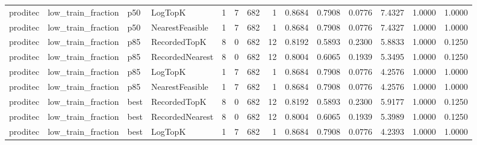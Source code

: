 \begin{tabular}{llllrrrrrrrrrr}
proditec &   low\_train\_fraction &    p50 &         LogTopK &           1 &          7 &            682 &                   1 &         0.8684 &          0.7908 &                    0.0776 &         7.4327 &                 1.0000 &                  1.0000 \\
proditec &   low\_train\_fraction &    p50 & NearestFeasible &           1 &          7 &            682 &                   1 &         0.8684 &          0.7908 &                    0.0776 &         7.4327 &                 1.0000 &                  1.0000 \\
proditec &   low\_train\_fraction &    p85 &    RecordedTopK &           8 &          0 &            682 &                  12 &         0.8192 &          0.5893 &                    0.2300 &         5.8833 &                 1.0000 &                  0.1250 \\
proditec &   low\_train\_fraction &    p85 & RecordedNearest &           8 &          0 &            682 &                  12 &         0.8004 &          0.6065 &                    0.1939 &         5.3495 &                 1.0000 &                  0.1250 \\
proditec &   low\_train\_fraction &    p85 &         LogTopK &           1 &          7 &            682 &                   1 &         0.8684 &          0.7908 &                    0.0776 &         4.2576 &                 1.0000 &                  1.0000 \\
proditec &   low\_train\_fraction &    p85 & NearestFeasible &           1 &          7 &            682 &                   1 &         0.8684 &          0.7908 &                    0.0776 &         4.2576 &                 1.0000 &                  1.0000 \\
proditec &   low\_train\_fraction &   best &    RecordedTopK &           8 &          0 &            682 &                  12 &         0.8192 &          0.5893 &                    0.2300 &         5.9177 &                 1.0000 &                  0.1250 \\
proditec &   low\_train\_fraction &   best & RecordedNearest &           8 &          0 &            682 &                  12 &         0.8004 &          0.6065 &                    0.1939 &         5.3989 &                 1.0000 &                  0.1250 \\
proditec &   low\_train\_fraction &   best &         LogTopK &           1 &          7 &            682 &                   1 &         0.8684 &          0.7908 &                    0.0776 &         4.2393 &                 1.0000 &                  1.0000 \\

\end{tabular}
